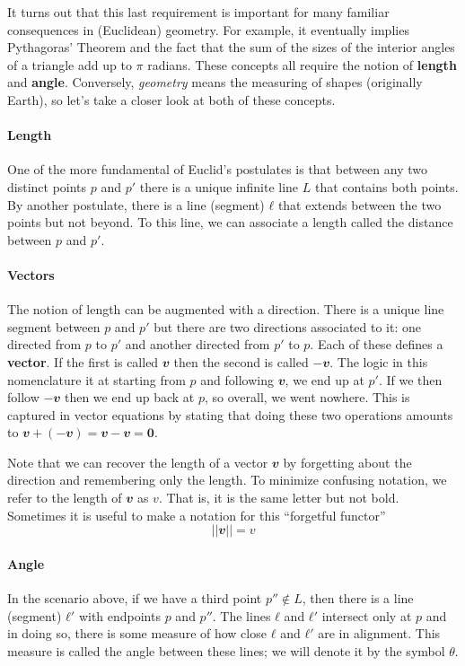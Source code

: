 It turns out that this last requirement is important for many familiar consequences in (Euclidean) geometry. For example, it eventually implies Pythagoras' Theorem and the fact that the sum of the sizes of the interior angles of a triangle add up to $π$ radians. 
These concepts all require the notion of {\bf length} and {\bf angle}. Conversely, {\em geometry} means the measuring of shapes (originally Earth), so let's take a closer look at both of these concepts. 

\paragraph{Length}
One of the more fundamental of Euclid's postulates is that between any two distinct points $p$ and $p'$ there is a unique infinite line $L$ that contains both points. By another postulate, there is a line (segment) $ℓ$ that extends between the two points but not beyond. To this line, we can associate a length called the distance between $p$ and $p'$. 

\paragraph{Vectors}
The notion of length can be augmented with a direction. There is a unique line segment between $p$ and $p'$ but there are two directions associated to it: one directed from $p$ to $p'$ and another directed from $p'$ to $p$. Each of these defines a {\bf vector}. If the first is called $𝒗$ then the second is called $-𝒗$. The logic in this nomenclature it at starting from $p$ and following $𝒗$, we end up at $p'$. If we then follow $-𝒗$ then we end up back at $p$, so overall, we went nowhere. This is captured in vector equations by stating that doing these two operations amounts to $𝒗 + (-𝒗)= 𝒗 - 𝒗 = 𝟎$.

Note that we can recover the length of a vector $𝒗$ by forgetting about the direction and remembering only the length. To minimize confusing notation, we refer to the length of $𝒗$ as $v$. That is, it is the same letter but not bold. Sometimes it is useful to make a notation for this “forgetful functor”
$$
|| 𝒗  || = v
$$

\paragraph{Angle}
In the scenario above, if we have a third point $p''∉ L$, then there is a line (segment) $ℓ'$ with endpoints $p$ and $p''$. The lines $ℓ$ and $ℓ'$ intersect only at $p$ and in doing so, there is some measure of how close $ℓ$ and $ℓ'$ are in alignment. This measure is called the angle between these lines; we will denote it by the symbol $θ$. 

